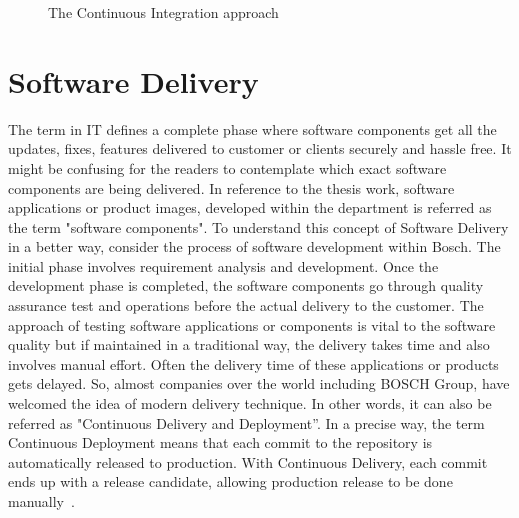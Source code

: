 \begin{figure}[H]
%
\caption[Continuous Integration approach]{The Continuous Integration approach\footnotemark}
\label{fig:Continuous Integration approach}
\end{figure}



\section{Software Delivery}\label{section:SoftwareDelivery}

The term  in IT defines a complete phase where software components get all the updates, fixes, features delivered to customer or clients securely and hassle free. It might be confusing for the readers to contemplate which exact software components are being delivered. In reference to the thesis work, software applications or product images, developed within the department is referred as the term "software components". To understand this concept of Software Delivery in a better way, consider the process of software development within Bosch. The initial phase involves requirement analysis and development. Once the development phase is completed, the software components go through quality assurance test and operations before the actual delivery to the customer. The approach of testing software applications or components is vital to the software quality but if maintained in a traditional way, the delivery takes time and also involves manual effort. Often the delivery time of these applications or products gets delayed. So, almost companies over the world including BOSCH Group, have welcomed the idea of modern delivery technique. In other words, it can also be referred as "Continuous Delivery and Deployment”. In a precise way, the term Continuous Deployment means that each commit to the repository is automatically released to production. With Continuous Delivery, each commit ends up with a release candidate, allowing production release to be done manually~\parencite{leszko2017continuous}.


